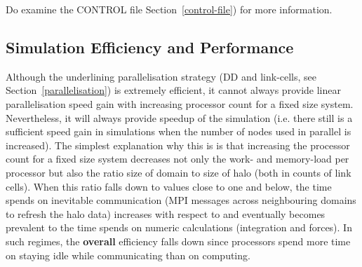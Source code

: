 Do examine the CONTROL file Section~\ref{control-file}) for more information.

\subsection{Simulation Efficiency and Performance}

Although the \D underlining parallelisation strategy (DD and
link-cells, see Section~\ref{parallelisation}) is extremely
efficient, it cannot always provide linear parallelisation speed
gain with increasing processor count for a fixed size system.
Nevertheless, it will always provide speedup of the simulation (i.e.
there still is a sufficient speed gain in simulations when the
number of nodes used in parallel is increased).  The simplest
explanation why this is is that increasing the processor count for a
fixed size system decreases not only the work- and memory-load per
processor but also the ratio size of domain to size of halo (both in
counts of link cells).  When this ratio falls down to values close
to one and below, the time \D spends on inevitable communication
(MPI messages across neighbouring domains to refresh the halo data)
increases with respect to and eventually becomes prevalent to the
time \D spends on numeric calculations (integration and forces).  In
such regimes, the {\bf overall} \D efficiency falls down since
processors spend more time on staying idle while communicating than
on computing.

